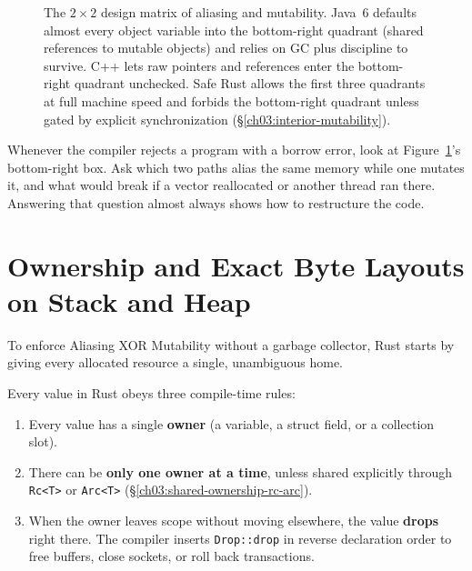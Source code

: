 \begin{figure}[H]
\caption{The $2 \times 2$ design matrix of aliasing and mutability. Java~6 defaults almost every object variable into the bottom-right quadrant (shared references to mutable objects) and relies on GC plus discipline to survive. C++ lets raw pointers and references enter the bottom-right quadrant unchecked. Safe Rust allows the first three quadrants at full machine speed and forbids the bottom-right quadrant unless gated by explicit synchronization (\S\ref{ch03:interior-mutability}).}
\label{ch03:fig-aliasing-quadrant}
\end{figure}

Whenever the compiler rejects a program with a borrow error, look at Figure~\ref{ch03:fig-aliasing-quadrant}'s bottom-right box. Ask which two paths alias the same memory while one mutates it, and what would break if a vector reallocated or another thread ran there. Answering that question almost always shows how to restructure the code.

\section{Ownership and Exact Byte Layouts on Stack and Heap}
\label{ch03:ownership-byte-layouts}

To enforce Aliasing XOR Mutability without a garbage collector, Rust starts by giving every allocated resource a single, unambiguous home.

\begin{definition}
\label{ch03:def-ownership-rules}
Every value in Rust obeys three compile-time rules:
\begin{enumerate}
  \item Every value has a single \textbf{owner} (a variable, a struct field, or a collection slot).
  \item There can be \textbf{only one owner at a time}, unless shared explicitly through \texttt{Rc<T>} or \texttt{Arc<T>} (\S\ref{ch03:shared-ownership-rc-arc}).
  \item When the owner leaves scope without moving elsewhere, the value \textbf{drops} right there. The compiler inserts \texttt{Drop::drop} in reverse declaration order to free buffers, close sockets, or roll back transactions.
\end{enumerate}
\end{definition}

